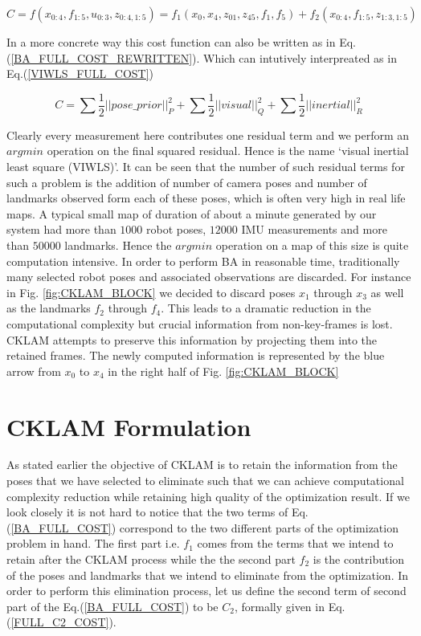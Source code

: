 \begin{equation}
  C = f(x_{0:4}, f_{1:5}, u_{0:3}, z_{0:4, 1:5}) = f_1(x_0, x_4, z_{01}, z_{45}, f_1, f_5) + f_2(x_{0:4}, f_{1:5}, z_{1:3, 1:5})
  \label{BA_FULL_COST}
\end{equation}

In a more concrete way this cost function can also be written as in Eq.(\ref{BA_FULL_COST_REWRITTEN}). Which can intutively interpreated as in Eq.(\ref{VIWLS_FULL_COST})

\begin{equation}
  C = \sum{\frac{1}{2}||pose\_prior||_P^2} + \sum{\frac{1}{2}||visual||_Q^2} + \sum{\frac{1}{2}||inertial||_R^2}
  \label{VIWLS_FULL_COST}
\end{equation}

Clearly every measurement here contributes one residual term and we perform an $argmin$ operation on the final squared residual. Hence is the name `visual inertial least square (VIWLS)'. It can be seen that the number of such residual terms for such a problem is the addition of number of camera poses and number of landmarks observed form each of these poses, which is often very high in real life maps. A typical small map of duration of about a minute generated by our system had more than $1000$ robot poses, $12000$ IMU measurements and more than $50000$ landmarks. Hence the $argmin$ operation on a map of this size is quite computation intensive. In order to perform BA in reasonable time, traditionally many selected robot poses and associated observations are discarded. For instance in Fig. \ref{fig:CKLAM_BLOCK} we decided to discard poses $x_1$ through $x_3$ as well as the landmarks $f_2$ through $f_4$. This leads to a dramatic reduction in the computational complexity but crucial information from non-key-frames is lost. CKLAM attempts to preserve this information by projecting them into the retained frames. The newly computed information is represented by the blue arrow from $x_0$ to $x_4$ in the right half of Fig. \ref{fig:CKLAM_BLOCK}

\section{CKLAM Formulation}
As stated earlier the objective of CKLAM is to retain the information from the poses that we have selected to eliminate such that we can achieve computational complexity reduction while retaining high quality of the optimization result. If we look closely it is not hard to notice that the two terms of Eq.(\ref{BA_FULL_COST}) correspond to the two different parts of the optimization problem in hand. The first part i.e. $f_1$ comes from the terms that we intend to retain after the CKLAM process while the the second part $f_2$ is the contribution of the poses and landmarks that we intend to eliminate from the optimization. In order to perform this elimination process, let us define the second term of second part of the Eq.(\ref{BA_FULL_COST}) to be $C_2$, formally given in Eq.(\ref{FULL_C2_COST}). 

